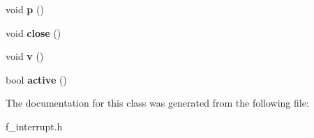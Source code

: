 \begin{DoxyCompactItemize}
\item 
\mbox{\label{classfsl_1_1hw_1_1standard__atomic_a565cf9de9b0e398778cbb059cdfbf1a2}} 
void {\bfseries p} ()
\item 
\mbox{\label{classfsl_1_1hw_1_1standard__atomic_a18531b6335c21dc1c382a2a377feeae4}} 
void {\bfseries close} ()
\item 
\mbox{\label{classfsl_1_1hw_1_1standard__atomic_acfc07270b3515d49732130cf2e63ca28}} 
void {\bfseries v} ()
\item 
\mbox{\label{classfsl_1_1hw_1_1standard__atomic_af5090182cc87270ac5a835b81c4fadaa}} 
bool {\bfseries active} ()
\end{DoxyCompactItemize}


The documentation for this class was generated from the following file\+:\begin{DoxyCompactItemize}
\item 
f\+\_\+interrupt.\+h\end{DoxyCompactItemize}
